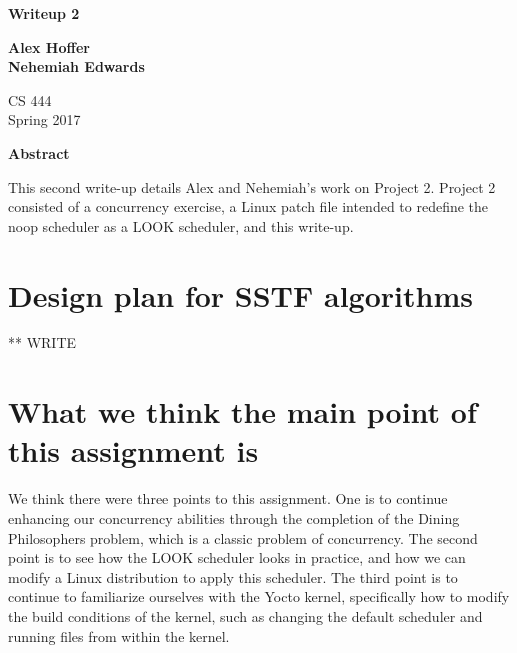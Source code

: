 \documentclass[letterpaper,10pt,titlepage]{article}
\begin{document}
\begin{titlepage}
    \begin{center}
        \vspace*{3.5cm}

        \textbf{Writeup 2}

        \vspace{0.5cm}

        \textbf{Alex Hoffer\\}
	\textbf{Nehemiah Edwards}

        \vspace{0.8cm}

        CS 444\\
        Spring 2017\\

        \vspace{1cm}

        \textbf{Abstract}\\

        \vspace{0.5cm}

	This second write-up details Alex and Nehemiah's work on Project 2. Project 2 consisted of a concurrency exercise, a Linux patch file intended to redefine the noop scheduler as a LOOK scheduler, and this write-up. 


        \vfill

    \end{center}
\end{titlepage}

\newpage

\tableofcontents

\newpage

\section{Design plan for SSTF algorithms}
** WRITE

\section{What we think the main point of this assignment is}
We think there were three points to this assignment. One is to continue enhancing our concurrency abilities through the completion of the Dining Philosophers problem, which is a classic problem of concurrency. The second point is to see how the LOOK scheduler looks in practice, and how we can modify a Linux distribution to apply this scheduler. The third point is to continue to familiarize ourselves with the Yocto kernel, specifically how to modify the build conditions of the kernel, such as changing the default scheduler and running files from within the kernel.
\end{document}
